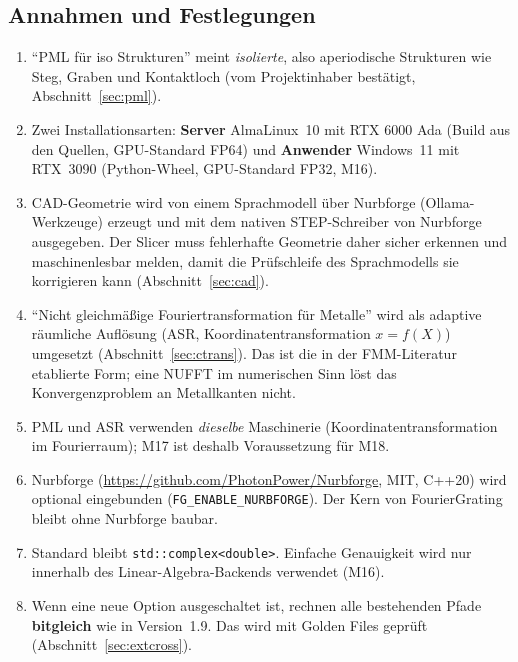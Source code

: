 \subsection{Annahmen und Festlegungen}
\begin{enumerate}[nosep]
  \item \enquote{PML für iso Strukturen} meint \emph{isolierte}, also aperiodische Strukturen wie Steg, Graben und
        Kontaktloch (vom Projektinhaber bestätigt, Abschnitt~\ref{sec:pml}).
  \item Zwei Installationsarten: \textbf{Server} AlmaLinux~10 mit RTX 6000 Ada (Build aus den Quellen, GPU-Standard FP64)
        und \textbf{Anwender} Windows~11 mit RTX~3090 (Python-Wheel, GPU-Standard FP32, M16).
  \item CAD-Geometrie wird von einem Sprachmodell über Nurbforge (Ollama-Werkzeuge) erzeugt und mit dem nativen
        STEP-Schreiber von Nurbforge ausgegeben. Der Slicer muss fehlerhafte Geometrie daher sicher erkennen und
        maschinenlesbar melden, damit die Prüfschleife des Sprachmodells sie korrigieren kann (Abschnitt~\ref{sec:cad}).
  \item \enquote{Nicht gleichmäßige Fouriertransformation für Metalle} wird als adaptive räumliche Auflösung
        (ASR, Koordinatentransformation $x=f(X)$) umgesetzt (Abschnitt~\ref{sec:ctrans}). Das ist die in der
        FMM-Literatur etablierte Form; eine NUFFT im numerischen Sinn löst das Konvergenzproblem an
        Metallkanten nicht.
  \item PML und ASR verwenden \emph{dieselbe} Maschinerie (Koordinatentransformation im Fourierraum);
        M17 ist deshalb Voraussetzung für M18.
  \item Nurbforge (\url{https://github.com/PhotonPower/Nurbforge}, MIT, C++20) wird optional eingebunden
        (\verb|FG_ENABLE_NURBFORGE|). Der Kern von FourierGrating bleibt ohne Nurbforge baubar.
  \item Standard bleibt \verb|std::complex<double>|. Einfache Genauigkeit wird nur innerhalb des
        Linear-Algebra-Backends verwendet (M16).
  \item Wenn eine neue Option ausgeschaltet ist, rechnen alle bestehenden Pfade \textbf{bitgleich} wie in
        Version~1.9. Das wird mit Golden Files geprüft (Abschnitt~\ref{sec:extcross}).
\end{enumerate}

